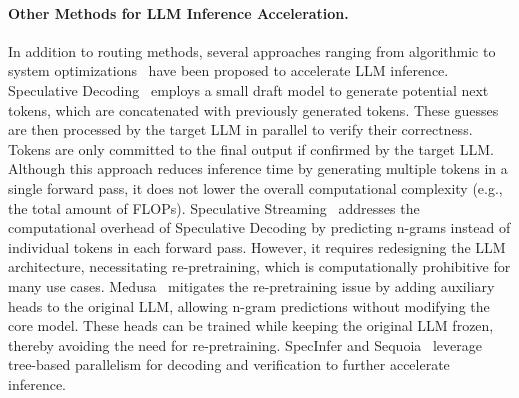 \paragraph{Other Methods for LLM Inference Acceleration.}
In addition to routing methods, several approaches ranging from algorithmic to system optimizations~\citep{miao2023specinfer,kwon2023efficient,chen2024magicdec} have been proposed to accelerate LLM inference. Speculative Decoding~\citep{leviathan2023fastinferencetransformersspeculative,chen2023accelerating} employs a small draft model to generate potential next tokens, which are concatenated with previously generated tokens. These guesses are then processed by the target LLM in parallel to verify their correctness. Tokens are only committed to the final output if confirmed by the target LLM. Although this approach reduces inference time by generating multiple tokens in a single forward pass, it does not lower the overall computational complexity (e.g., the total amount of FLOPs). Speculative Streaming~\citep{bhendawade2024speculativestreamingfastllm} addresses the computational overhead of Speculative Decoding by predicting n-grams instead of individual tokens in each forward pass. However, it requires redesigning the LLM architecture, necessitating re-pretraining, which is computationally prohibitive for many use cases. Medusa~\citep{cai2024medusa} mitigates the re-pretraining issue by adding auxiliary heads to the original LLM, allowing n-gram predictions without modifying the core model. These heads can be trained while keeping the original LLM frozen, thereby avoiding the need for re-pretraining. SpecInfer and Sequoia~\citep{miao2023specinfer,chen2024sequoia} leverage tree-based parallelism for decoding and verification to further accelerate inference.

\vspace{-1em}